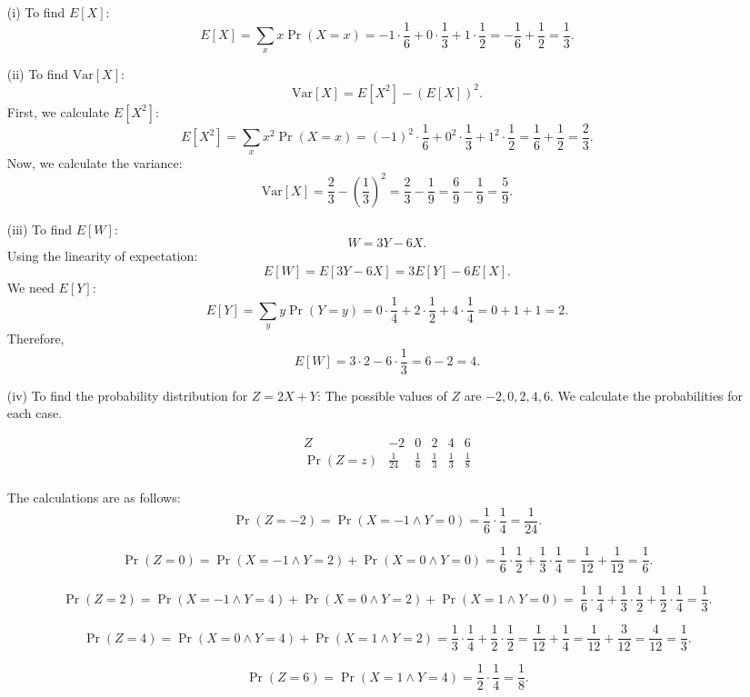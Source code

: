\begin{solution}
\begin{enumerate}
    \item[(i)] To find ${E}[X]$:
    \[
    {E}[X] = \sum_{x} x \Pr(X = x) = -1 \cdot \frac{1}{6} + 0 \cdot \frac{1}{3} + 1 \cdot \frac{1}{2} = -\frac{1}{6} + \frac{1}{2} = \frac{1}{3}.
    \]

    \item[(ii)] To find $\mathrm{Var}[X]$:
    \[
    \mathrm{Var}[X] = {E}[X^2] - ({E}[X])^2.
    \]
    First, we calculate ${E}[X^2]$:
    \[
    {E}[X^2] = \sum_{x} x^2 \Pr(X = x) = (-1)^2 \cdot \frac{1}{6} + 0^2 \cdot \frac{1}{3} + 1^2 \cdot \frac{1}{2} = \frac{1}{6} + \frac{1}{2} = \frac{2}{3}.
    \]
    Now, we calculate the variance:
    \[
    \mathrm{Var}[X] = \frac{2}{3} - \left(\frac{1}{3}\right)^2 = \frac{2}{3} - \frac{1}{9} = \frac{6}{9} - \frac{1}{9} = \frac{5}{9}.
    \]

    \item[(iii)] To find ${E}[W]$:
    \[
    W = 3Y - 6X.
    \]
    Using the linearity of expectation:
    \[
    {E}[W] = {E}[3Y - 6X] = 3{E}[Y] - 6{E}[X].
    \]
    We need ${E}[Y]$:
    \[
    {E}[Y] = \sum_{y} y \Pr(Y = y) = 0 \cdot \frac{1}{4} + 2 \cdot \frac{1}{2} + 4 \cdot \frac{1}{4} = 0 + 1 + 1 = 2.
    \]
    Therefore,
    \[
    {E}[W] = 3 \cdot 2 - 6 \cdot \frac{1}{3} = 6 - 2 = 4.
    \]

    \item[(iv)] To find the probability distribution for $Z = 2X + Y$:
    The possible values of $Z$ are $-2, 0, 2, 4, 6$. We calculate the probabilities for each case.

    \[
    \begin{array}{c|ccccc}
    Z & -2 & 0 & 2 & 4 & 6 \\
    \hline
    \Pr(Z = z) & \frac{1}{24} & \frac{1}{6} & \frac{1}{3} & \frac{1}{3} & \frac{1}{8} \\
    \end{array}
    \]

    The calculations are as follows:
    \[
    \Pr(Z = -2) = \Pr(X = -1 \land Y = 0) = \frac{1}{6} \cdot \frac{1}{4} = \frac{1}{24}.
    \]

    \[
    \Pr(Z = 0) = \Pr(X = -1 \land Y = 2) + \Pr(X = 0 \land Y = 0) = \frac{1}{6} \cdot \frac{1}{2} + \frac{1}{3} \cdot \frac{1}{4} = \frac{1}{12} + \frac{1}{12} = \frac{1}{6}.
    \]

    \[
    \Pr(Z = 2) = \Pr(X = -1 \land Y = 4) + \Pr(X = 0 \land Y = 2) + \Pr(X = 1 \land Y = 0) =\ \frac{1}{6} \cdot \frac{1}{4} + \frac{1}{3} \cdot \frac{1}{2} + \frac{1}{2} \cdot \frac{1}{4}  = \frac{1}{3}.
    \]

    \[
    \Pr(Z = 4) = \Pr(X = 0 \land Y = 4) + \Pr(X = 1 \land Y = 2) = \frac{1}{3} \cdot \frac{1}{4} + \frac{1}{2} \cdot \frac{1}{2} = \frac{1}{12} + \frac{1}{4} = \frac{1}{12} + \frac{3}{12} = \frac{4}{12} = \frac{1}{3}.
    \]

    \[
    \Pr(Z = 6) = \Pr(X = 1 \land Y = 4) = \frac{1}{2} \cdot \frac{1}{4} = \frac{1}{8}.
    \]

\end{enumerate}
\end{solution}


